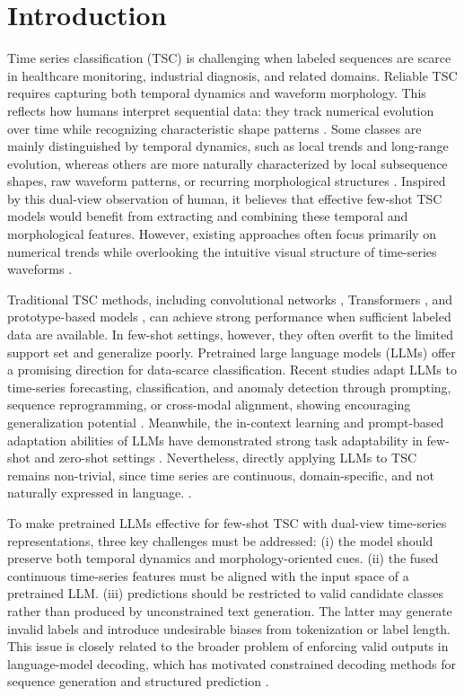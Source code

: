 \documentclass[10pt,journal,compsoc]{IEEEtran}
\begin{document}
\section{Introduction}
Time series classification (TSC) is challenging when labeled sequences are scarce in healthcare monitoring, industrial diagnosis, and related domains\cite{ismail2019deep}.
Reliable TSC requires capturing both temporal dynamics and waveform morphology. This reflects how humans interpret sequential data: they track numerical evolution over time while recognizing characteristic shape patterns \cite{cleveland1984graphical, heer2010tour}. Some classes are mainly distinguished by temporal dynamics, such as local trends and long-range evolution, whereas others are more naturally characterized by local subsequence shapes, raw waveform patterns, or recurring morphological structures \cite{ye2009shapelets,wang2015encoding}. Inspired by this dual-view observation of human, it believes that effective few-shot TSC models would benefit from extracting and combining these temporal and morphological features. However, existing approaches often focus primarily on numerical trends while overlooking the intuitive visual structure of time-series waveforms \cite{dempster2020rocket,tapnet,tang2020interpretable}.

Traditional TSC methods, including convolutional networks \cite{fawaz2020inceptiontime}, Transformers \cite{dyformer}, and prototype-based models \cite{tapnet}, can achieve strong performance when sufficient labeled data are available. In few-shot settings, however, they often overfit to the limited support set and generalize poorly\cite{chen2025llmfew}.
Pretrained large language models (LLMs) offer a promising direction for data-scarce classification. Recent studies adapt LLMs to time-series forecasting, classification, and anomaly detection through prompting, sequence reprogramming, or cross-modal alignment, showing encouraging generalization potential \cite{gruver2023large,zhou2023onefitsall,jin2024timellm,sun2023test}. Meanwhile, the in-context learning and prompt-based adaptation abilities of LLMs have demonstrated strong task adaptability in few-shot and zero-shot settings \cite{brown2020language,dong2024survey}.
Nevertheless, directly applying LLMs to TSC remains non-trivial, since time series are continuous, domain-specific, and not naturally expressed in language. \cite{zheng2025understanding}.

To make pretrained LLMs effective for few-shot TSC with dual-view time-series representations, three key challenges must be addressed: (i) the model should preserve both temporal dynamics and morphology-oriented cues. (ii) the fused continuous time-series features must be aligned with the input space of a pretrained LLM. (iii) predictions should be restricted to valid candidate classes rather than produced by unconstrained text generation. The latter may generate invalid labels and introduce undesirable biases from tokenization or label length. This issue is closely related to the broader problem of enforcing valid outputs in language-model decoding, which has motivated constrained decoding methods for sequence generation and structured prediction \cite{hokamp2017lexically,koo2024automata}.
\end{document}
